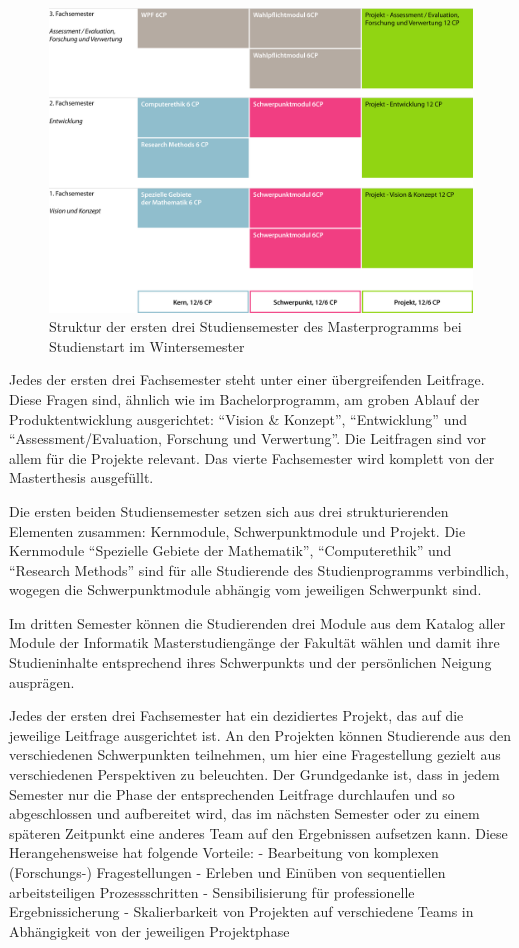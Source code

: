 \begin{figure}[htbp]
\centering
\includegraphics[width=\columnwidth]{../anhaenge/bilder/ma-struktur.png}
\caption{Struktur der ersten drei Studiensemester des Masterprogramms
bei Studienstart im Wintersemester}
\end{figure}

Jedes der ersten drei Fachsemester steht unter einer übergreifenden
Leitfrage. Diese Fragen sind, ähnlich wie im Bachelorprogramm, am groben
Ablauf der Produktentwicklung ausgerichtet: ``Vision \& Konzept'',
``Entwicklung'' und ``Assessment/Evaluation, Forschung und Verwertung''.
Die Leitfragen sind vor allem für die Projekte relevant. Das vierte
Fachsemester wird komplett von der Masterthesis ausgefüllt.

Die ersten beiden Studiensemester setzen sich aus drei strukturierenden
Elementen zusammen: Kernmodule, Schwerpunktmodule und Projekt. Die
Kernmodule ``Spezielle Gebiete der Mathematik'', ``Computerethik'' und
``Research Methods'' sind für alle Studierende des Studienprogramms
verbindlich, wogegen die Schwerpunktmodule abhängig vom jeweiligen
Schwerpunkt sind.

Im dritten Semester können die Studierenden drei Module aus dem Katalog
aller Module der Informatik Masterstudiengänge der Fakultät wählen und
damit ihre Studieninhalte entsprechend ihres Schwerpunkts und der
persönlichen Neigung ausprägen.

Jedes der ersten drei Fachsemester hat ein dezidiertes Projekt, das auf
die jeweilige Leitfrage ausgerichtet ist. An den Projekten können
Studierende aus den verschiedenen Schwerpunkten teilnehmen, um hier eine
Fragestellung gezielt aus verschiedenen Perspektiven zu beleuchten. Der
Grundgedanke ist, dass in jedem Semester nur die Phase der
entsprechenden Leitfrage durchlaufen und so abgeschlossen und
aufbereitet wird, das im nächsten Semester oder zu einem späteren
Zeitpunkt eine anderes Team auf den Ergebnissen aufsetzen kann. Diese
Herangehensweise hat folgende Vorteile: - Bearbeitung von komplexen
(Forschungs-) Fragestellungen - Erleben und Einüben von sequentiellen
arbeitsteiligen Prozessschritten - Sensibilisierung für professionelle
Ergebnissicherung - Skalierbarkeit von Projekten auf verschiedene Teams
in Abhängigkeit von der jeweiligen Projektphase

